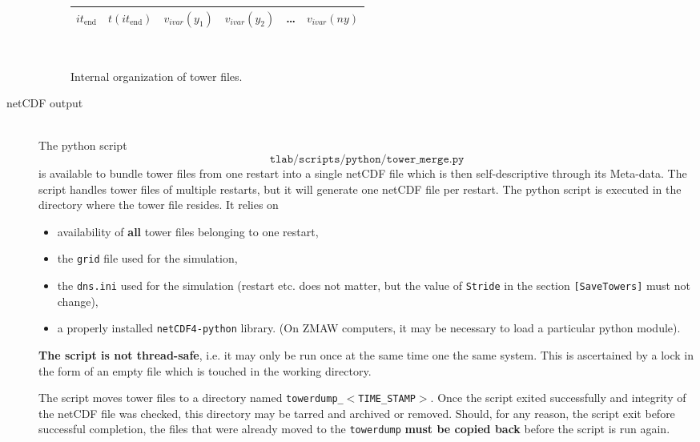 \begin{description}
\begin{figure}
\begin{centering}
\begin{tabular}{| l | l | c | c | c | c | }
        $it_\mathrm{end}$   & $t(it_\mathrm{end})$ & $v_{ivar}(y_1)$ & $v_{ivar}(y_2)$ & \ldots & $v_{ivar}(ny)$ \\ 
        \hline
      \end{tabular}\\
    \end{centering}
  \caption{Internal organization of tower files.}
   \end{figure}  
  \item[netCDF output]~ \\ 
    The python script \[\texttt{tlab/scripts/python/tower\_merge.py}\] is available to bundle tower files from one restart into a single netCDF file which 
    is then self-descriptive through its Meta-data. The script handles tower files of multiple restarts, but it will generate one netCDF file per restart.  
    The python script is executed in the directory where the tower file resides. 
    It relies on 
    \begin{itemize}  
      \item availability of \textbf{all} tower files belonging to one restart, 
      \item the \texttt{grid} file used for the simulation,
      \item the \texttt{dns.ini} used for the simulation (restart etc. does not matter, but the value of \texttt{Stride} 
        in the section \texttt{[SaveTowers]} must not change),
      \item a properly installed \texttt{netCDF4-python} library. (On ZMAW computers, it may be necessary to load a particular 
        python module).  
        
    \end{itemize} 
    \textbf{The script is not thread-safe}, i.e. it may only be run once at the same time 
    one the same system. This is ascertained by a lock in the form of an empty file which is touched 
    in the working directory. 
    \par 
    The script moves tower files to a directory named \texttt{towerdump\_}$<$\texttt{TIME\_STAMP}$>$. Once the script 
    exited successfully and integrity of the netCDF file was checked, this directory may be tarred and archived or removed. 
    Should, for any reason, the script exit before successful completion, the files that were already moved to the \texttt{towerdump} 
    \textbf{must be copied back} before the script is run again. 
\end{description}

